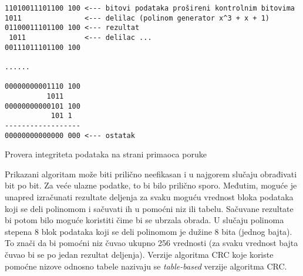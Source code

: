 \documentclass[12pt,oneside]{memoir}
\begin{document}
\begin{listing}[!ht]
\begin{verbatim}
11010011101100 100 <--- bitovi podataka prošireni kontrolnim bitovima
1011               <--- delilac (polinom generator x^3 + x + 1)
01100011101100 100 <--- rezultat
 1011              <--- delilac ...
00111011101100 100

......

00000000001110 100
          1011
00000000000101 100
           101 1
------------------
00000000000000 000 <--- ostatak
\end{verbatim}
\caption{Provera integriteta podataka na strani primaoca poruke}
\label{primalac_poruke}
\end{listing}

Prikazani algoritam može biti prilično neefikasan i u najgorem slučaju obrađivati bit 
po bit. Za veće ulazne podatke, to bi bilo prilično sporo. Međutim, moguće je unapred 
izračunati rezultate deljenja za svaku moguću vrednost bloka podataka koji se deli 
polinomom i sačuvati ih u pomoćni niz ili tabelu. Sačuvane rezultate bi potom bilo 
moguće koristiti čime bi se ubrzala obrada. U slučaju polinoma stepena 8 blok podataka 
koji se deli polinomom je dužine 8 bita (jednog bajta). To znači da bi pomoćni niz 
čuvao ukupno 256 vrednosti (za svaku vrednost bajta čuvao bi se po jedan rezultat 
deljenja). Verzije algoritma CRC koje koriste pomoćne nizove odnosno tabele nazivaju 
se \textit{table-based} verzije algoritma CRC.


\end{document}

